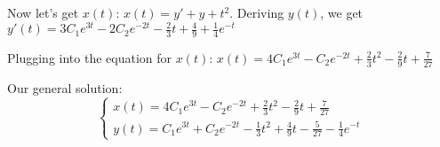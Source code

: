 \documentclass{article}
\begin{document}
\noindent Now let's get $x(t)$: $x(t) = y' + y + t^{2}$.  Deriving $y(t)$, we get $y'(t) = 3C_{1}e^{3t} - 2C_{2}e^{-2t} - \frac{2}{3}t + \frac{4}{9} + \frac{1}{4}e^{-t}$ \par

\noindent Plugging into the equation for $x(t)$: $x(t) = 4C_{1}e^{3t} - C_{2}e^{-2t} + \frac{2}{3}t^{2} - \frac{2}{9}t + \frac{7}{27}$ \par\vspace{0.25cm}

\noindent Our general solution: $$
\begin{cases}
x(t) = 4C_{1}e^{3t} - C_{2}e^{-2t} + \frac{2}{3}t^{2} - \frac{2}{9}t + \frac{7}{27} \\
y(t) = C_{1}e^{3t} + C_{2}e^{-2t} - \frac{1}{3}t^{2} + \frac{4}{9}t - \frac{5}{27} - \frac{1}{4}e^{-t}
\end{cases}
$$ \par
\end{document}
